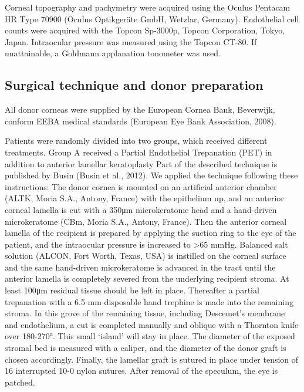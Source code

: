 \documentclass[authordate, empirical,issue]{jote-new-article}
\begin{document}
	Corneal topography and pachymetry were acquired using the Oculus Pentacam HR Type 70900 (Oculus Optikgeräte GmbH, Wetzlar, Germany). Endothelial cell counts were acquired with the Topcon Sp-3000p, Topcon Corporation, Tokyo, Japan. Intraocular pressure was measured using the Topcon CT-80. If unattainable, a Goldmann applanation tonometer was used.



	\subsection{Surgical technique and donor preparation}



	All donor corneas were supplied by the European Cornea Bank, Beverwijk, conform EEBA medical standards (European Eye Bank Association, 2008).



	Patients were randomly divided into two groups, which received different treatments. Group A received a Partial Endothelial Trepanation (PET) in addition to anterior lamellar keratoplasty Part of the described technique is published by Busin (Busin et al., 2012).\textsuperscript{ }We applied the technique following these instructions: The donor cornea is mounted on an artificial anterior chamber (ALTK, Moria S.A., Antony, France) with the epithelium up, and an anterior corneal lamella is cut with a 350μm microkeratome head and a hand-driven microkeratome (CBm, Moria S.A., Antony, France). Then the anterior corneal lamella of the recipient is prepared by applying the suction ring to the eye of the patient, and the intraocular pressure is increased to >65 mmHg. Balanced salt solution (ALCON, Fort Worth, Texas, USA) is instilled on the corneal surface and the same hand-driven microkeratome is advanced in the tract until the anterior lamella is completely severed from the underlying recipient stroma. At least 100μm residual tissue should be left in place. Thereafter a partial trepanation with a 6.5 mm disposable hand trephine is made into the remaining stroma. In this grove of the remaining tissue, including Descemet's membrane and endothelium, a cut is completed manually and oblique with a Thornton knife over 180-270°. This small ‘island' will stay in place. The diameter of the exposed stromal bed is measured with a caliper, and the diameter of the donor graft is chosen accordingly. Finally, the lamellar graft is sutured in place under tension of 16 interrupted 10-0 nylon sutures. After removal of the speculum, the eye is patched.
\end{document}
